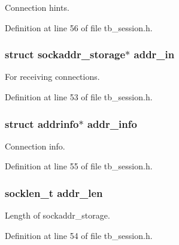 Connection hints. 



Definition at line 56 of file tb\-\_\-session.\-h.

\hypertarget{structtb__session__t_ab617a1bfa381136f3c0811b771c618e9}{
\subsubsection[{addr\-\_\-in}]{\setlength{\rightskip}{0pt plus 5cm}struct sockaddr\-\_\-storage$\ast$ addr\-\_\-in}}\label{structtb__session__t_ab617a1bfa381136f3c0811b771c618e9}


For receiving connections. 



Definition at line 53 of file tb\-\_\-session.\-h.

\hypertarget{structtb__session__t_aab742bc33815bd69bf49ad1861006b97}{
\subsubsection[{addr\-\_\-info}]{\setlength{\rightskip}{0pt plus 5cm}struct addrinfo$\ast$ addr\-\_\-info}}\label{structtb__session__t_aab742bc33815bd69bf49ad1861006b97}


Connection info. 



Definition at line 55 of file tb\-\_\-session.\-h.

\hypertarget{structtb__session__t_a116941d922ae354d7241d04b0f3c84d8}{
\subsubsection[{addr\-\_\-len}]{\setlength{\rightskip}{0pt plus 5cm}socklen\-\_\-t addr\-\_\-len}}\label{structtb__session__t_a116941d922ae354d7241d04b0f3c84d8}


Length of sockaddr\-\_\-storage. 



Definition at line 54 of file tb\-\_\-session.\-h.

